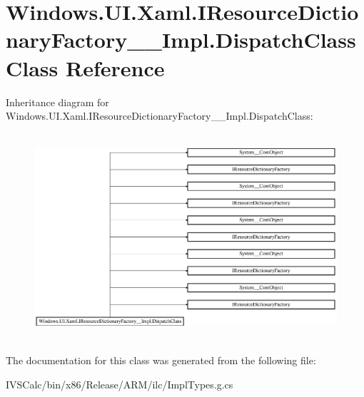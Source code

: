 \hypertarget{class_windows_1_1_u_i_1_1_xaml_1_1_i_resource_dictionary_factory_____impl_1_1_dispatch_class}{}\section{Windows.\+U\+I.\+Xaml.\+I\+Resource\+Dictionary\+Factory\+\_\+\+\_\+\+Impl.\+Dispatch\+Class Class Reference}
\label{class_windows_1_1_u_i_1_1_xaml_1_1_i_resource_dictionary_factory_____impl_1_1_dispatch_class}
Inheritance diagram for Windows.\+U\+I.\+Xaml.\+I\+Resource\+Dictionary\+Factory\+\_\+\+\_\+\+Impl.\+Dispatch\+Class\+:\begin{figure}[H]
\begin{center}
\leavevmode
\includegraphics[height=7.700000cm]{class_windows_1_1_u_i_1_1_xaml_1_1_i_resource_dictionary_factory_____impl_1_1_dispatch_class}
\end{center}
\end{figure}


The documentation for this class was generated from the following file\+:\begin{DoxyCompactItemize}
\item 
I\+V\+S\+Calc/bin/x86/\+Release/\+A\+R\+M/ilc/Impl\+Types.\+g.\+cs\end{DoxyCompactItemize}
